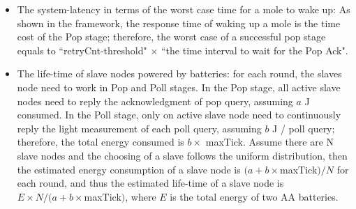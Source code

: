 \documentclass[letterpaper, 10pt]{article}
\begin{document}
\begin{itemize}
	\item The system-latency in terms of the worst case time for a mole to wake up: As shown in the framework, the response time of waking up a mole is the time cost of the Pop stage; therefore, the worst case of a successful pop stage equals to ``retryCnt-threshold" $\times$ ``the time interval to wait for the Pop Ack".
	\item The life-time of slave nodes powered by batteries: for each round, the slaves node need to work in Pop and Poll stages. In the Pop stage, all active slave nodes need to reply the acknowledgment of pop query, assuming $a$ J consumed. In the Poll stage, only on active slave node need to continuously reply the light measurement of each poll query, assuming $b$ J / poll query; therefore, the total energy consumed is $b\times$ maxTick. Assume there are N slave nodes and the choosing of a slave follows the uniform distribution, then the estimated energy consumption of a slave node is $(a+b\times$maxTick$)/N$ for each round, and thus the estimated life-time of a slave node is $E\times N/(a+b\times$maxTick$)$, where $E$ is the total energy of two AA batteries.
\end{itemize}
\end{document}
